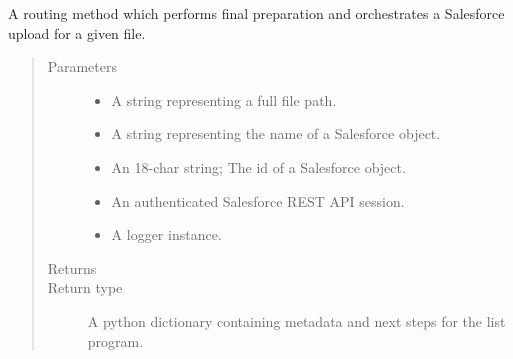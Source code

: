 \documentclass[letterpaper,10pt,english]{sphinxmanual}
\begin{document}

\begin{fulllineitems}
\label{\detokenize{index:ListManagement.utility.processes.sfdc_upload}}
A routing method which performs final preparation and orchestrates a Salesforce upload
for a given file.
\begin{quote}\begin{description}
\item[{Parameters}] \leavevmode\begin{itemize}
\item {} 
 \textendash{} A string representing a full file path.

\item {} 
 \textendash{} A string representing the name of a Salesforce object.

\item {} 
 \textendash{} An 18-char string; The id of a Salesforce object.

\item {} 
 \textendash{} An authenticated Salesforce REST API session.

\item {} 
 \textendash{} A logger instance.

\end{itemize}

\item[{Returns}] \leavevmode


\item[{Return type}] \leavevmode
A python dictionary containing metadata and next steps for the list program.

\end{description}\end{quote}

\end{fulllineitems}

\end{document}
